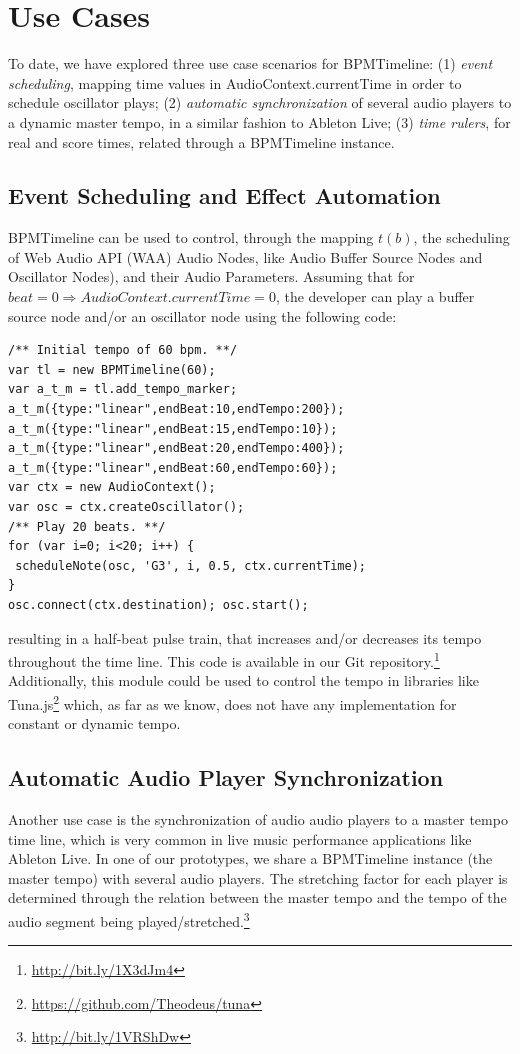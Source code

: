 \documentclass{sig-alternate}
\begin{document}
\section{Use Cases}
To date, we have explored three use case scenarios for BPMTimeline: (1) \textit{event scheduling}, mapping time values in AudioContext.currentTime in order to schedule oscillator plays; (2) \textit{automatic synchronization} of several audio players to a dynamic master tempo, in a similar fashion to Ableton Live; (3) \textit{time rulers}, for real and score times, related through a BPMTimeline instance.

\subsection{Event Scheduling and Effect Automation}
BPMTimeline can be used to control, through the mapping $t(b)$, the scheduling of Web Audio API (WAA) Audio Nodes, like Audio Buffer Source Nodes and Oscillator Nodes), and their Audio Parameters. Assuming that for $beat=0 \Rightarrow AudioContext.currentTime=0$, the developer can play a buffer source node and/or an oscillator node using the following code:
\begin{lstlisting}
/** Initial tempo of 60 bpm. **/
var tl = new BPMTimeline(60);
var a_t_m = tl.add_tempo_marker;
a_t_m({type:"linear",endBeat:10,endTempo:200});
a_t_m({type:"linear",endBeat:15,endTempo:10});
a_t_m({type:"linear",endBeat:20,endTempo:400});
a_t_m({type:"linear",endBeat:60,endTempo:60});
var ctx = new AudioContext();
var osc = ctx.createOscillator();
/** Play 20 beats. **/
for (var i=0; i<20; i++) {
 scheduleNote(osc, 'G3', i, 0.5, ctx.currentTime);
}
osc.connect(ctx.destination); osc.start();
\end{lstlisting}
resulting in a half-beat pulse train, that increases and/or decreases its tempo throughout the time line. This code is available in our Git repository.\footnote{\url{http://bit.ly/1X3dJm4}} Additionally, this module could be used to control the tempo in libraries like Tuna.js\footnote{\url{https://github.com/Theodeus/tuna}} which, as far as we know, does not have any implementation for constant or dynamic tempo.

\subsection{Automatic Audio Player Synchronization}
Another use case is the synchronization of audio audio players to a master tempo time line, which is very common in live music performance applications like Ableton Live. In one of our prototypes, we share a BPMTimeline instance (the master tempo) with several audio players. The stretching factor for each player is determined through the relation between the master tempo and the tempo of the audio segment being played/stretched.\footnote{\url{http://bit.ly/1VRShDw}}
\end{document}
